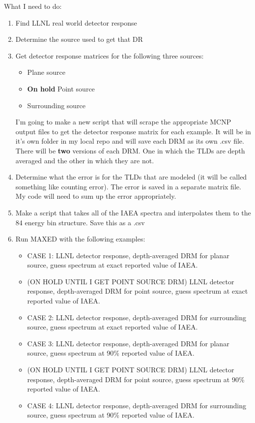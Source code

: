 \documentclass[11pt]{article}
\begin{document}
What I need to do:
\begin{enumerate}
\item[\checkmark] Find LLNL real world detector response
\item[\checkmark] Determine the source used to get that DR
\item Get detector response matrices for the following three sources:
\begin{itemize}
\item[\checkmark] Plane source
\item \textbf{On hold} Point source
\item[\checkmark] Surrounding source
\end{itemize}
I'm going to make a new script that will scrape the appropriate MCNP output files to get the detector response matrix for each example. It will be in it's own folder in my local repo and will save each DRM as its own .csv file. There will be \textbf{two} versions of each DRM. One in which the TLDs are depth averaged and the other in which they are not.
\item[\checkmark] Determine what the error is for the TLDs that are modeled (it will be called something like counting error). The error is saved in a separate matrix file. My code will need to sum up the error appropriately.
\item[\checkmark] Make a script that takes all of the IAEA spectra and interpolates them to the 84 energy bin structure. Save this as a .csv
\item Run MAXED with the following examples:
	\begin{itemize}
	\item[\checkmark] CASE 1: LLNL detector response, depth-averaged DRM for planar source, guess spectrum at exact reported value of IAEA.
	\item (ON HOLD UNTIL I GET POINT SOURCE DRM) LLNL detector response, depth-averaged DRM for point source, guess spectrum at exact reported value of IAEA.
	\item[\checkmark] CASE 2: LLNL detector response, depth-averaged DRM for surrounding source, guess spectrum at exact reported value of IAEA.
	\item[\checkmark] CASE 3: LLNL detector response, depth-averaged DRM for planar source, guess spectrum at 90\% reported value of IAEA.
	\item (ON HOLD UNTIL I GET POINT SOURCE DRM) LLNL detector response, depth-averaged DRM for point source, guess spectrum at 90\% reported value of IAEA.
	\item [\checkmark] CASE 4: LLNL detector response, depth-averaged DRM for surrounding source, guess spectrum at 90\% reported value of IAEA.\\

\end{itemize}
\end{enumerate}
\end{document}
